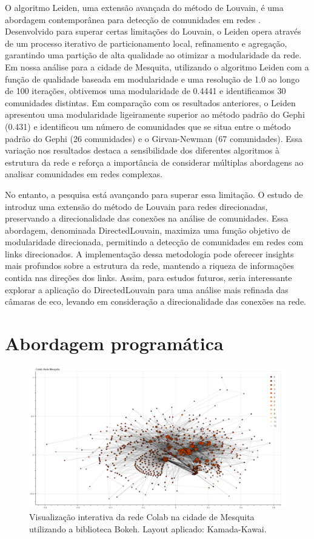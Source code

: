 O algoritmo Leiden, uma extensão avançada do método de Louvain, é uma abordagem contemporânea para detecção de comunidades em redes \cite{2018_Traag}. Desenvolvido para superar certas limitações do Louvain, o Leiden opera através de um processo iterativo de particionamento local, refinamento e agregação, garantindo uma partição de alta qualidade ao otimizar a modularidade da rede. Em nossa análise para a cidade de Mesquita, utilizando o algoritmo Leiden com a função de qualidade baseada em modularidade e uma resolução de 1.0 ao longo de 100 iterações, obtivemos uma modularidade de 0.4441 e identificamos 30 comunidades distintas. Em comparação com os resultados anteriores, o Leiden apresentou uma modularidade ligeiramente superior ao método padrão do Gephi (0.431) e identificou um número de comunidades que se situa entre o método padrão do Gephi (26 comunidades) e o Girvan-Newman (67 comunidades). Essa variação nos resultados destaca a sensibilidade dos diferentes algoritmos à estrutura da rede e reforça a importância de considerar múltiplas abordagens ao analisar comunidades em redes complexas.

No entanto, a pesquisa está avançando para superar essa limitação. O estudo de  introduz uma extensão do método de Louvain para redes direcionadas, preservando a direcionalidade das conexões na análise de comunidades. Essa abordagem, denominada DirectedLouvain, maximiza uma função objetivo de modularidade direcionada, permitindo a detecção de comunidades em redes com links direcionados. A implementação dessa metodologia pode oferecer insights mais profundos sobre a estrutura da rede, mantendo a riqueza de informações contida nas direções dos links. Assim, para estudos futuros, seria interessante explorar a aplicação do DirectedLouvain para uma análise mais refinada das câmaras de eco, levando em consideração a direcionalidade das conexões na rede.

\section{Abordagem programática}

\begin{figure}[h]
    \centering
    \includegraphics[scale=0.32]{images/bokeh_plot.png}
    \caption{Visualização interativa da rede Colab na cidade de Mesquita utilizando a biblioteca Bokeh. Layout aplicado: Kamada-Kawai.}
    \label{fig:bokeh_plot}
	\fautor
\end{figure}

